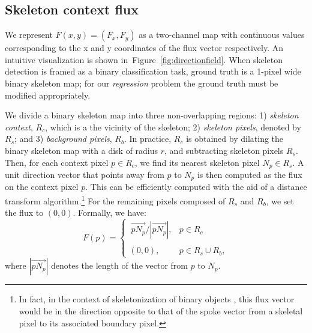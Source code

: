 \documentclass[10pt,twocolumn,letterpaper]{article}
\newcommand{\reffig}[1]{Figure~\ref{#1}}
\begin{document}
\subsection{Skeleton context flux} \label{sec:directionfield}
We represent $F(x,y) = (F_x, F_y)$ as a two-channel map with continuous values corresponding to the x and y coordinates of the flux vector respectively.
An intuitive visualization is shown in~\reffig{fig:directionfield}.
When skeleton detection is framed as a binary classification task, ground truth is a 1-pixel wide binary skeleton map; for our \emph{regression} problem the ground truth must be modified appropriately.

We divide a binary skeleton map into three non-overlapping regions: 1) {\it skeleton context}, $R_c$, which is a the vicinity of the skeleton; 2) {\it skeleton pixels}, denoted by $R_s$; and 3) {\it background pixels}, $R_b$. In practice, $R_c$ is obtained by dilating the binary skeleton map with a disk of radius $r$, and subtracting skeleton pixels $R_s$. Then, for each context pixel $p \in R_c$, we find its nearest skeleton pixel $N_p \in R_s$. A unit direction vector that points away from $p$ to $N_p$ is then computed as the flux on the context pixel $p$.
This can be efficiently computed with the aid of a distance transform algorithm.\footnote{In fact, in the context of skeletonization of binary objects \cite{siddiqi2008}, this flux vector would be in the direction opposite to that of the spoke vector from a skeletal pixel to its associated boundary pixel.} For the remaining pixels composed of $R_s$ and $R_b$, we set the flux to $(0, 0)$. Formally, we have:
\begin{equation}
F(p) =
\left\{
\begin{matrix} \
\overrightarrow{p N_p}/\left\vert\overrightarrow{p N_p}\right\vert, & p\in R_c  \\ \\
(0,0), & p \in R_s \cup R_b,
\end{matrix}
\right.
\label{eq:sklrep}
\end{equation}
where $\left\vert\overrightarrow{p N_p}\right\vert$ denotes the length of the vector from $p$ to $N_p$.
\end{document}

